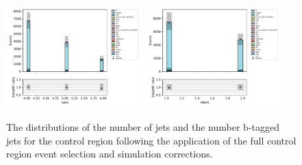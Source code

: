\begin{figure}[tbp]
\centering
\includegraphics[width=0.47\textwidth]{figs/tzq-fullSelection-plots/plots_emu/nJets.pdf}
\includegraphics[width=0.47\textwidth]{figs/tzq-fullSelection-plots/plots_emu/nBjets.pdf}
\caption{
The distributions of the number of jets and the number b-tagged jets for the \ttbar control region following the application of the full control region event selection and simulation corrections.
}
\label{fig:ttbarCR_nJets}
\end{figure}

